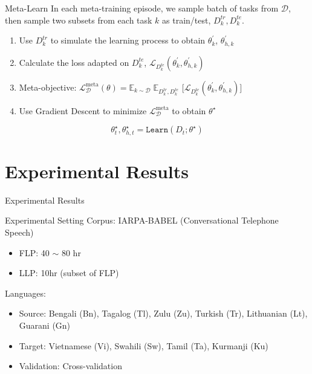 \documentclass{beamer}
\begin{document}
\begin{frame}[t]{Meta-Learn}
  In each meta-training episode, we sample batch of tasks from $\mathcal{D}$, \\
  then sample two subsets from each task $k$ as train/test, $D^{tr}_k, D^{te}_k$.

  \begin{enumerate}
    \item Use $D^{tr}_k$ to simulate the learning process to obtain $\theta^\prime_k$, $\theta^\prime_{h,k}$
    \item Calculate the loss adapted on $D^{te}_k$, $\mathcal{L}_{D^{te}_k}(\theta^\prime_k, \theta^\prime_{h,k})$
    \item Meta-objective: $\mathcal{L}^{\text{meta}}_{\mathcal{D}}(\theta) =  \mathbb{E}_{k \sim \mathcal{D}} \; \mathbb{E}_{D_k^{tr}, D_k^{te}}$ $\Big [ \mathcal{L}_{D^{te}_k}(\theta^\prime_k, \theta^\prime_{h,k}) \Big ]$
    \item Use Gradient Descent to minimize $\mathcal{L}^{\text{meta}}_{\mathcal{D}}$ to obtain $\theta^\star$
  \end{enumerate}
  \pause
  \vspace{2em}
  \begin{equation*}
    \theta^{\star}_t, \theta^{\star}_{h,t} = \texttt{Learn}(D_t;\theta^{\star}) 
  \end{equation*}
\end{frame}

\section{Experimental Results}
\begin{frame}
	\begin{center}
    \LARGE{Experimental Results}
	\end{center}
\end{frame}

\begin{frame}[t]{Experimental Setting}
  Corpus: IARPA-BABEL (Conversational Telephone Speech)
  \begin{itemize}
    \item FLP: 40 $\sim$ 80 hr
    \item LLP: 10hr (subset of FLP)
  \end{itemize}
  \pause
  Languages:
  \begin{itemize}
    \item Source: Bengali (Bn), Tagalog (Tl), Zulu (Zu), Turkish (Tr), Lithuanian (Lt), Guarani (Gn)
    \item Target: Vietnamese (Vi), Swahili (Sw), Tamil (Ta), Kurmanji (Ku)
    \item Validation: Cross-validation
  \end{itemize}
\end{frame}
\end{document}
